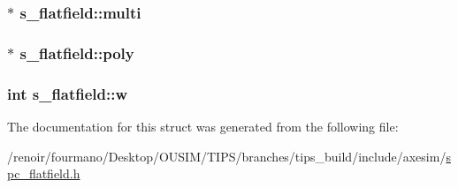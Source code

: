 \label{structs__flatfield_affab7067e6e424adb423dc8de163bd5e}
\hypertarget{structs__flatfield_a34eb871ec49e718e1e1b87d5f219c18d}{
\subsubsection[{multi}]{$\ast$ {\bf s\_\-flatfield::multi}}}
\label{structs__flatfield_a34eb871ec49e718e1e1b87d5f219c18d}
\hypertarget{structs__flatfield_a15327899ebefeb485896f96b795d846e}{
\subsubsection[{poly}]{$\ast$ {\bf s\_\-flatfield::poly}}}
\label{structs__flatfield_a15327899ebefeb485896f96b795d846e}
\hypertarget{structs__flatfield_a06769e5af56e9be88885af9cd2e25dd9}{
\subsubsection[{w}]{\setlength{\rightskip}{0pt plus 5cm}int {\bf s\_\-flatfield::w}}}
\label{structs__flatfield_a06769e5af56e9be88885af9cd2e25dd9}


The documentation for this struct was generated from the following file:\begin{DoxyCompactItemize}
\item 
/renoir/fourmano/Desktop/OUSIM/TIPS/branches/tips\_\-build/include/axesim/\hyperlink{spc__flatfield_8h}{spc\_\-flatfield.h}\end{DoxyCompactItemize}
